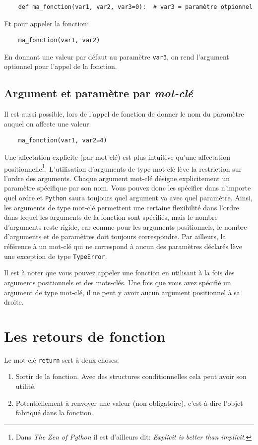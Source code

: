 \documentclass[a4paper,12pt]{book}
\begin{document}
\begin{verbatim}
    def ma_fonction(var1, var2, var3=0):  # var3 = paramètre otpionnel
\end{verbatim}
\medskip

Et pour appeler la fonction:
\begin{verbatim}
    ma_fonction(var1, var2)
\end{verbatim}
\medskip

En donnant une valeur par défaut au paramètre \texttt{var3}, on rend l'argument optionnel pour l'appel de la fonction.
\medskip

\subsection*{Argument et paramètre par \textit{mot-clé}}
Il est aussi possible, lors de l'appel de fonction de donner le nom du paramètre auquel on affecte une valeur:
\begin{verbatim}
    ma_fonction(var1, var2=4)
\end{verbatim}
\medskip

Une affectation explicite (par mot-clé) est plus intuitive qu'une affectation positionnelle\footnote{Dans \textit{The Zen of Python} il est d'ailleurs dit: \og \textit{Explicit is better than implicit}\fg{}.}. L'utilisation d'arguments de type mot-clé lève la restriction sur l'ordre des arguments. Chaque argument mot-clé désigne explicitement un paramètre spécifique par son nom. Vous pouvez donc les spécifier dans n'importe quel ordre et \texttt{Python} saura toujours quel argument va avec quel paramètre. Ainsi, les arguments de type mot-clé permettent une certaine flexibilité dans l'ordre dans lequel les arguments de la fonction sont spécifiés, mais le nombre d'arguments reste rigide, car comme pour les arguments positionnels, le nombre d'arguments et de paramètres doit toujours correspondre. Par ailleurs, la référence à un mot-clé qui ne correspond à aucun des paramètres déclarés lève une exception de type \texttt{TypeError}.
\medskip

Il est à noter que vous pouvez appeler une fonction en utilisant à la fois des arguments positionnels et des mots-clés. Une fois que vous avez spécifié un argument de type mot-clé, il ne peut y avoir aucun argument positionnel à sa droite.
\medskip

\section{Les retours de fonction}
Le mot-clé \texttt{return} sert à deux choses:
\begin{enumerate}
	\item Sortir de la fonction. Avec des structures conditionnelles cela peut avoir son utilité.
	\item Potentiellement à renvoyer une valeur (non obligatoire), c'est-à-dire l'objet fabriqué dans la fonction.
\end{enumerate}
\medskip
\end{document}
